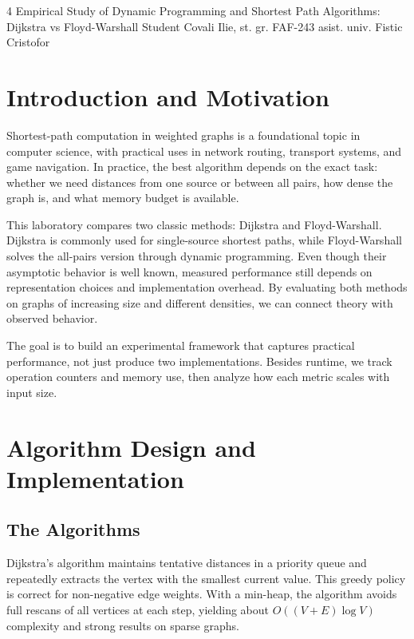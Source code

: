 \documentclass{labreport}
\begin{document}
\labtitle
    {4}
    {Empirical Study of Dynamic Programming and Shortest Path Algorithms: Dijkstra vs Floyd-Warshall}
    {Student}
    {Covali Ilie, st. gr. FAF-243}
    {asist. univ. Fistic Cristofor}

\tableofcontents
\newpage

\lstset{style=python}

\section{Introduction and Motivation}

Shortest-path computation in weighted graphs is a foundational topic in computer science, with practical uses in network routing, transport systems, and game navigation. In practice, the best algorithm depends on the exact task: whether we need distances from one source or between all pairs, how dense the graph is, and what memory budget is available.

This laboratory compares two classic methods: Dijkstra and Floyd-Warshall. Dijkstra is commonly used for single-source shortest paths, while Floyd-Warshall solves the all-pairs version through dynamic programming. Even though their asymptotic behavior is well known, measured performance still depends on representation choices and implementation overhead. By evaluating both methods on graphs of increasing size and different densities, we can connect theory with observed behavior.

The goal is to build an experimental framework that captures practical performance, not just produce two implementations. Besides runtime, we track operation counters and memory use, then analyze how each metric scales with input size.

\section{Algorithm Design and Implementation}

\subsection{The Algorithms}

Dijkstra's algorithm maintains tentative distances in a priority queue and repeatedly extracts the vertex with the smallest current value. This greedy policy is correct for non-negative edge weights. With a min-heap, the algorithm avoids full rescans of all vertices at each step, yielding about $O((V + E) \log V)$ complexity and strong results on sparse graphs.
\end{document}
